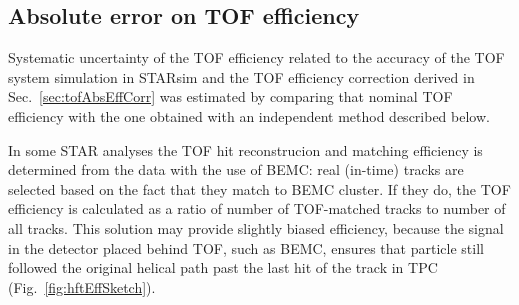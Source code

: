 \subsection{Absolute error on TOF efficiency}\label{subsec:tofAbsEffSystAndCorr}

Systematic uncertainty of the TOF efficiency related to the accuracy of the TOF system simulation in STARsim and the TOF efficiency correction derived in Sec.~\ref{sec:tofAbsEffCorr} was estimated by comparing that nominal TOF efficiency with the one obtained with an independent method described below.

In some STAR analyses the TOF hit reconstrucion and matching efficiency is determined from the data with the use of BEMC: real (in-time) tracks are selected based on the fact that they match to BEMC cluster. If they do, the TOF efficiency is calculated as a ratio of number of TOF-matched tracks to number of all tracks. This solution may provide slightly biased efficiency, because the signal in the detector placed behind TOF, such as BEMC, ensures that particle still followed the original helical path past the last hit of the track in TPC (Fig.~\ref{fig:hftEffSketch}).%

